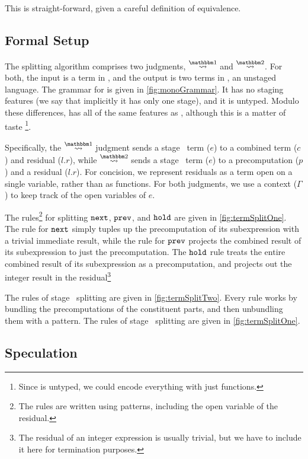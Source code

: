 This is straight-forward, given a careful definition of equivalence.

\subsection {Formal Setup}

The splitting algorithm comprises two judgments, $\splitonesym$ and $\splittwosym$.
For both, the input is a term in \lang, and the output is two terms in \langmono, an
unstaged language.  The grammar for \langmono is given in \ref{fig:monoGrammar}.  It has no
staging features (we say that implicitly it has only one stage), and it is untyped.  
Modulo these differences, \langmono has all of the same features as \lang, 
although this is a matter of taste
\footnote{Since \lang is untyped, we could encode everything with just functions.}.

Specifically, the $\splitonesym$ judgment sends a stage \bbone\ term ($e$) to a combined term ($c$) and residual ($l.r$),
while $\splittwosym$ sends a stage \bbtwo\ term ($e$) to a precomputation ($p$) and a residual ($l.r$).
For concision, we represent residuals as a term open on a single variable, rather than as functions.
For both judgments, we use a context ($\Gamma$) to keep track of the open variables of $e$.

The rules\footnote{The rules are written using patterns, including the open variable of the residual.} 
for splitting ${\tt next}$, ${\tt prev}$, and ${\tt hold}$ are given in \ref{fig:termSplitOne}.
The rule for ${\tt next}$ simply tuples up the precomputation of its subexpression with a trivial immediate result,
while the rule for ${\tt prev}$ projects the combined result of its subexpression to just the precomputation.
The ${\tt hold}$ rule treats the entire combined result of its subexpression as a precomputation, 
and projects out the integer result in the residual\footnote{The residual of an integer expression is usually trivial, 
but we have to include it here for termination purposes.}

The rules of stage \bbtwo\ splitting are given in \ref{fig:termSplitTwo}.  
Every rule works by bundling the precomputations of the constituent parts, and then unbundling them with a pattern.
The rules of stage \bbone\ splitting are given in \ref{fig:termSplitOne}.  


\subsection {Speculation}

